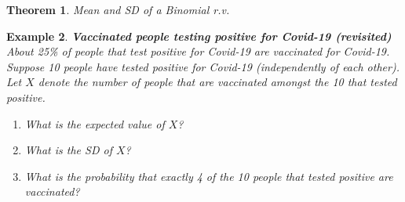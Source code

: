 \documentclass[12pt]{amsart}
\newtheorem{theorem}{Theorem}[section]
\newtheorem{example}[theorem]{Example}
\begin{document}
{\begin{theorem}{Mean and SD of a Binomial r.v.}

\vspace{3cm}


\end{theorem}






\begin{example}\label{VaccBinom10}  \textbf{Vaccinated people testing positive for Covid-19 (revisited)} \newline
About 25\% of people that test positive for Covid-19 are vaccinated for Covid-19.\newline
Suppose 10 people have tested positive for Covid-19 (independently of each other). \newline
Let $X$ denote the number of people that are vaccinated amongst the 10 that tested positive.

\begin{enumerate}


\item What is the expected value of $X$?

\vspace{5cm}

\item What is the SD of $X$?

\vspace{2cm}
%




\newpage

\item What is the probability that exactly 4 of the 10 people that tested positive are vaccinated?



\end{enumerate}
\end{example}}
\end{document}
